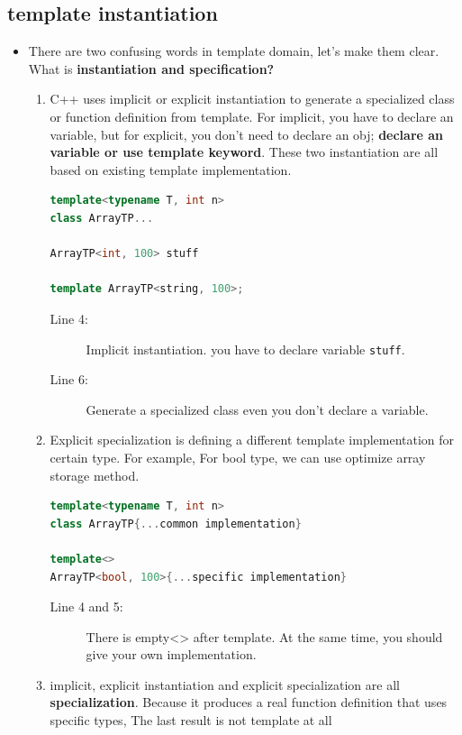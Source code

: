 \documentclass[a4paper,11pt,twoside]{book}
\begin{document}
\subsection{template instantiation}
\begin{itemize}
\item There are two confusing words in template domain, let's make them clear. What is \textbf{instantiation and specification?}
\begin{enumerate}
	\item C++ uses implicit or explicit instantiation to generate a specialized class or function definition from template. For implicit, you have to declare an variable, but for explicit, you don't need to declare an obj; \textbf{declare an variable or use template keyword}. These two instantiation are all based on existing template implementation.
	
\begin{lstlisting}[frame=single, language=c++]
template<typename T, int n>
class ArrayTP...
	
ArrayTP<int, 100> stuff 
	
template ArrayTP<string, 100>;
\end{lstlisting}
\begin{description}
	\item[Line 4:] Implicit instantiation. you have to declare variable \texttt{stuff}.
	\item[Line 6:] Generate a specialized class even you don't declare a variable.
\end{description}

	\item Explicit specialization is defining a different template implementation for certain type. For example, For bool type, we can use optimize array storage method.
\begin{lstlisting}[frame=single, language=c++]
template<typename T, int n>
class ArrayTP{...common implementation}
	
template<>
ArrayTP<bool, 100>{...specific implementation}
\end{lstlisting}
\begin{description}
	\item[Line 4 and 5:] There is empty<> after template. At the same time, you should give your own implementation.
\end{description}
	
	\item implicit, explicit instantiation and explicit specialization are all \textbf{specialization}. Because it produces a real function definition that uses specific types, The last result is not template at all 
	

\end{enumerate}
\end{itemize}
\end{document}
